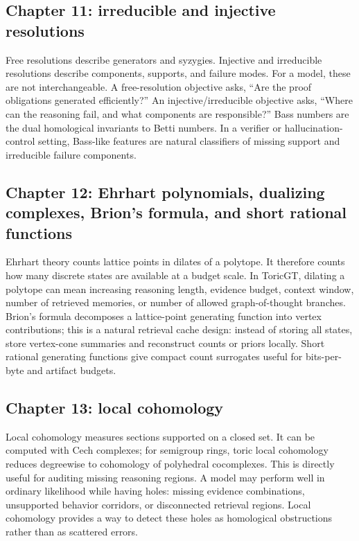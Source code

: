 \documentclass[11pt]{article}
\theoremstyle{definition}
\begin{document}
\subsection{Chapter 11: irreducible and injective resolutions}
Free resolutions describe generators and syzygies.  Injective and irreducible resolutions describe components, supports, and failure modes.  For a model, these are not interchangeable.  A free-resolution objective asks, ``Are the proof obligations generated efficiently?''  An injective/irreducible objective asks, ``Where can the reasoning fail, and what components are responsible?''  Bass numbers are the dual homological invariants to Betti numbers.  In a verifier or hallucination-control setting, Bass-like features are natural classifiers of missing support and irreducible failure components.

\subsection{Chapter 12: Ehrhart polynomials, dualizing complexes, Brion's formula, and short rational functions}
Ehrhart theory counts lattice points in dilates of a polytope.  It therefore counts how many discrete states are available at a budget scale.  In ToricGT, dilating a polytope can mean increasing reasoning length, evidence budget, context window, number of retrieved memories, or number of allowed graph-of-thought branches.  Brion's formula decomposes a lattice-point generating function into vertex contributions; this is a natural retrieval cache design: instead of storing all states, store vertex-cone summaries and reconstruct counts or priors locally.  Short rational generating functions give compact count surrogates useful for bits-per-byte and artifact budgets.

\subsection{Chapter 13: local cohomology}
Local cohomology measures sections supported on a closed set.  It can be computed with Cech complexes; for semigroup rings, toric local cohomology reduces degreewise to cohomology of polyhedral cocomplexes.  This is directly useful for auditing missing reasoning regions.  A model may perform well in ordinary likelihood while having holes: missing evidence combinations, unsupported behavior corridors, or disconnected retrieval regions.  Local cohomology provides a way to detect these holes as homological obstructions rather than as scattered errors.
\end{document}
